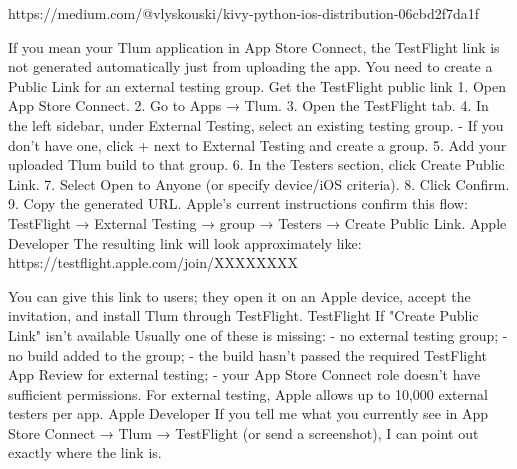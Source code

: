 
https://medium.com/@vlyskouski/kivy-python-ios-distribution-06cbd2f7da1f


If you mean your Tlum application in App Store Connect, the TestFlight link is not generated automatically just from uploading the app. You need to create a Public Link for an external testing group.
Get the TestFlight public link
1. Open App Store Connect.
2. Go to Apps → Tlum.
3. Open the TestFlight tab.
4. In the left sidebar, under External Testing, select an existing testing group.
   - If you don't have one, click + next to External Testing and create a group.
5. Add your uploaded Tlum build to that group.
6. In the Testers section, click Create Public Link.
7. Select Open to Anyone (or specify device/iOS criteria).
8. Click Confirm.
9. Copy the generated URL.
Apple's current instructions confirm this flow: TestFlight → External Testing → group → Testers → Create Public Link. Apple Developer
The resulting link will look approximately like:
https://testflight.apple.com/join/XXXXXXXX

You can give this link to users; they open it on an Apple device, accept the invitation, and install Tlum through TestFlight. TestFlight
If "Create Public Link" isn't available
Usually one of these is missing:
- no external testing group;
- no build added to the group;
- the build hasn't passed the required TestFlight App Review for external testing;
- your App Store Connect role doesn't have sufficient permissions.
For external testing, Apple allows up to 10,000 external testers per app. Apple Developer
If you tell me what you currently see in App Store Connect → Tlum → TestFlight (or send a screenshot), I can point out exactly where the link is.